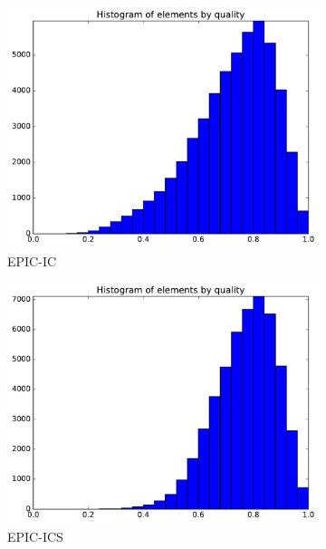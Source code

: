 \documentclass[3p,times,procedia,number]{elsarticle}
\begin{document}
\begin{figure}
\begin{subfigure}{.24\textwidth}
\centering
\includegraphics[width=\textwidth]{epic-ic-cube-linear-quality.pdf}
\caption{EPIC-IC}
\end{subfigure}
\begin{subfigure}{.24\textwidth}
\centering
\includegraphics[width=\textwidth]{epic-ics-cube-linear-quality.pdf}
\caption{EPIC-ICS}
\end{subfigure}
\begin{subfigure}{.24\textwidth}
\centering

\end{subfigure}
\end{figure}
\end{document}
